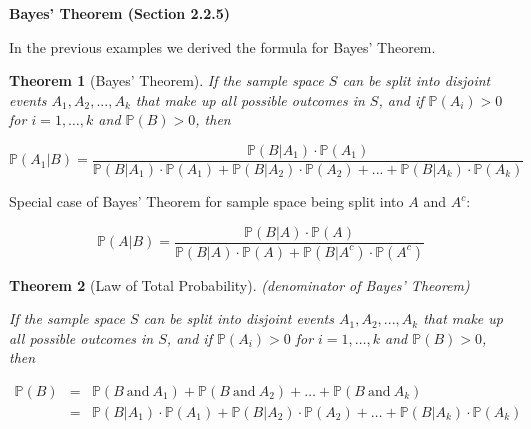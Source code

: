 \documentclass[12pt]{amsart}
\newtheorem{theorem}{Theorem}[section]
\begin{document}
{\large

\newpage
\textbf{Bayes' Theorem (Section 2.2.5)}

\vspace{0.5cm}
In the previous examples we derived the formula for Bayes' Theorem.
\vspace{0.5cm}


\begin{theorem}[Bayes' Theorem]  

If the sample space $S$ can be split into disjoint events $A_1, A_2, ..., A_k$ that make up all possible outcomes in $S$, and if  $\mathbb{P}(A_i)>0$ for $i=1,\ldots, k$ and $\mathbb{P}(B)>0$, then


$$
\mathbb{P}(A_1 | B) = 
\frac{\mathbb{P}(B|A_1) \cdot \mathbb{P}(A_1)}
{\mathbb{P}(B|A_1) \cdot \mathbb{P}(A_1) + \mathbb{P}(B|A_2) \cdot \mathbb{P}(A_2) + ... + 
\mathbb{P}(B|A_k) \cdot \mathbb{P}(A_k)}
$$

\vspace{0.5cm}

\end{theorem}

\vspace{0.8cm}

Special case of Bayes' Theorem for sample space being split into $A$ and $A^c$: 

$$
\mathbb{P}(A | B) = 
\frac{\mathbb{P}(B|A) \cdot \mathbb{P}(A)}
{\mathbb{P}(B|A) \cdot \mathbb{P}(A) + \mathbb{P}(B|A^c) \cdot \mathbb{P}(A^c) }
$$

\vspace{1cm}
\begin{theorem}[Law of Total Probability] (denominator of Bayes' Theorem)\newline  

If the sample space $S$ can be split into disjoint events $A_1, A_2, ..., A_k$ that make up all possible outcomes in $S$, and if  $\mathbb{P}(A_i)>0$ for $i=1,\ldots, k$ and $\mathbb{P}(B)>0$, then


\[
\begin{array}{ccl}
\mathbb{P}(B)&=& \mathbb{P}(B\ \textrm{and}\ A_1) + \mathbb{P}(B\ \textrm{and}\ A_2) + \ldots + \mathbb{P}(B\ \textrm{and}\ A_k)\\
		   &=& \mathbb{P}(B|A_1) \cdot \mathbb{P}(A_1) + \mathbb{P}(B|A_2) \cdot \mathbb{P}(A_2) + \ldots + \mathbb{P}(B|A_k) \cdot \mathbb{P}(A_k)
\end{array}
\]


\end{theorem}}
\end{document}
